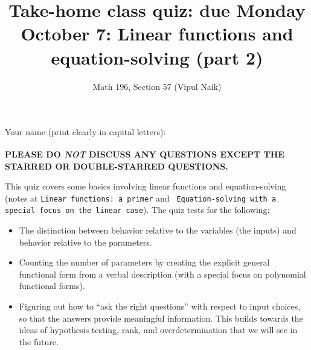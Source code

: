 \documentclass[10pt]{amsart}
\title{Take-home class quiz: due Monday October 7: Linear functions and equation-solving (part 2)}
\author{Math 196, Section 57 (Vipul Naik)}
\begin{document}
\maketitle

Your name (print clearly in capital letters): $\underline{\qquad\qquad\qquad\qquad\qquad\qquad\qquad\qquad\qquad\qquad}$

{\bf PLEASE DO {\em NOT} DISCUSS ANY QUESTIONS EXCEPT THE STARRED OR DOUBLE-STARRED QUESTIONS.}

This quiz covers some basics involving linear functions and
equation-solving (notes at {\tt Linear functions: a primer} and {\tt
  Equation-solving with a special focus on the linear case}). The quiz
tests for the following:

\begin{itemize}
\item The distinction between behavior relative to the variables (the
  inputs) and behavior relative to the parameters.
\item Counting the number of parameters by creating the explicit
  general functional form from a verbal description (with a special
  focus on polynomial functional forms).
\item Figuring out how to ``ask the right questions'' with respect to
  input choices, so that the answers provide meaningful
  information. This builds towards the ideas of hypothesis testing,
  rank, and overdetermination that we will see in the future.
\end{itemize}
\end{document}
